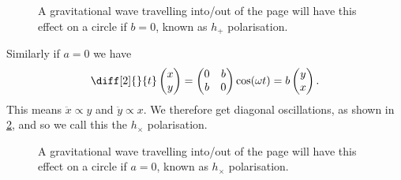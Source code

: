 \documentclass[fleqn]{NotesClass}
\begin{document}
    \begin{figure}
        \caption[Gravitational wave with \(h_+\) polarisation.]{A gravitational wave travelling into/out of the page will have this effect on a circle if \(b = 0\), known as \(h_+\) polarisation.}
        \label{fig:GW + polarised}
    \end{figure}
    
    Similarly if \(a = 0\) we have
    \begin{equation}
        \diff[2]{}{t}
        \begin{pmatrix}
            x\\ y
        \end{pmatrix}
        = 
        \begin{pmatrix}
            0 & b\\
            b & 0
        \end{pmatrix}
        \cos(\omega t) = b
        \begin{pmatrix}
            y\\ x
        \end{pmatrix}
        .
    \end{equation}
    This means \(\ddot{x} \propto y\) and \(\ddot{y} \propto x\).
    We therefore get diagonal oscillations, as shown in \cref{fig:GW x polarised}, and so we call this the \(h_{\times}\) polarisation.
    
    \begin{figure}
        \caption[Gravitational wave with \(h_{\times}\) polarisation.]{A gravitational wave travelling into/out of the page will have this effect on a circle if \(a = 0\), known as \(h_\times\) polarisation.}
        \label{fig:GW x polarised}
    \end{figure}
    
\end{document}
